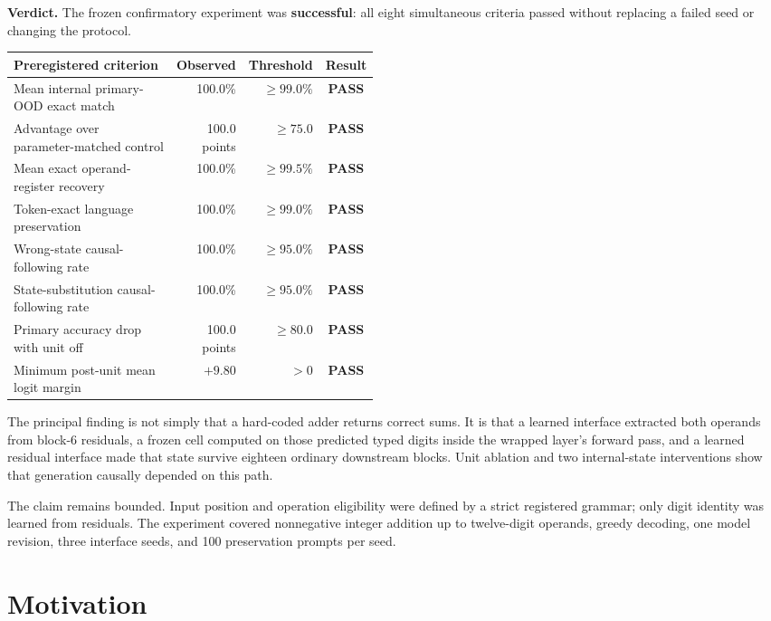 \documentclass[11pt]{article}
\newcommand{\pass}{\textcolor{passgreen}{\textbf{PASS}}}
\begin{document}
\noindent\textbf{Verdict.} The frozen confirmatory experiment was
\textcolor{passgreen}{\textbf{successful}}: all eight simultaneous criteria
passed without replacing a failed seed or changing the protocol.

\begin{center}
\small
\begin{tabular}{p{0.47\linewidth}rrc}
\toprule
Preregistered criterion & Observed & Threshold & Result\\
\midrule
Mean internal primary-OOD exact match & 100.0\% & $\geq 99.0\%$ & \pass\\
Advantage over parameter-matched control & 100.0 points & $\geq 75.0$ & \pass\\
Mean exact operand-register recovery & 100.0\% & $\geq 99.5\%$ & \pass\\
Token-exact language preservation & 100.0\% & $\geq 99.0\%$ & \pass\\
Wrong-state causal-following rate & 100.0\% & $\geq 95.0\%$ & \pass\\
State-substitution causal-following rate & 100.0\% & $\geq 95.0\%$ & \pass\\
Primary accuracy drop with unit off & 100.0 points & $\geq 80.0$ & \pass\\
Minimum post-unit mean logit margin & $+9.80$ & $>0$ & \pass\\
\bottomrule
\end{tabular}
\end{center}

\noindent The principal finding is not simply that a hard-coded adder returns
correct sums. It is that a learned interface extracted both operands from
block-6 residuals, a frozen cell computed on those predicted typed digits
inside the wrapped layer's forward pass, and a learned residual interface made
that state survive eighteen ordinary downstream blocks. Unit ablation and two
internal-state interventions show that generation causally depended on this
path.

\noindent The claim remains bounded. Input position and operation eligibility
were defined by a strict registered grammar; only digit identity was learned
from residuals. The experiment covered nonnegative integer addition up to
twelve-digit operands, greedy decoding, one model revision, three interface
seeds, and 100 preservation prompts per seed.

\section{Motivation}
\end{document}
